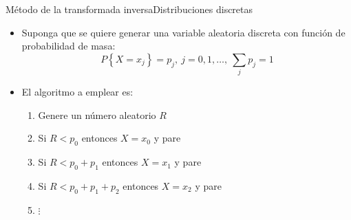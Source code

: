 \begin{frame}{Método de la transformada inversa}{Distribuciones discretas}
    \begin{itemize}
        \item Suponga que se quiere generar una variable aleatoria discreta con función de probabilidad de masa:
    \begin{equation*}
        P\left\{X=x_j\right\}=p_j, ~ j=0,1,\dots , ~\sum_j{p_j}=1
    \end{equation*}
    \item El algoritmo a emplear es:
    \begin{enumerate}
        \item Genere un número aleatorio $R$
        \item Si $R<p_0$ entonces $X=x_0$ y pare
        \item Si $R<p_0+p_1$ entonces $X=x_1$ y pare
        \item Si $R<p_0+p_1+p_2$ entonces $X=x_2$ y pare
        \item $\vdots$
    \end{enumerate}
    \end{itemize}
\end{frame}
